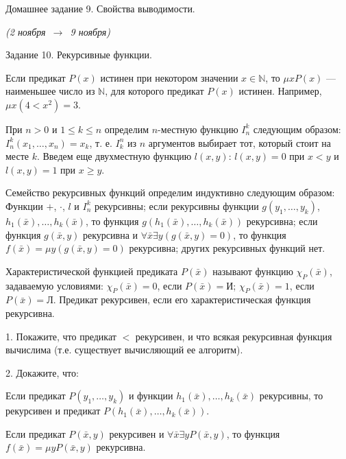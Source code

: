 \documentclass[a4paper,11pt]{article}
\begin{document}

   \newcommand{\enumsep}{\vspace{-2.8mm}
   		\begin{enumerate}[itemsep=0.4mm,leftmargin=2.5mm]}

\begin{center}
	{\Large Домашнее задание 9. Свойства выводимости.}

	{\it (2 ноября\ \(\to\)\ 9 ноября)}
\end{center}


\begin{center}
Задание 10. Рекурсивные функции. 
\end{center}

Если предикат $P(x)$ истинен при
некотором значении $x \in \mathbb{N}$, то $\mu x P(x)$ --- наименьшее
число из $\mathbb{N}$, для которого предикат $P(x)$ истинен. Например,
$\mu x(4 < x^2) = 3$.

 При $n > 0$ и $1 \leq k \leq n$ определим
$n$-местную функцию $I_n^k$ следующим образом: $I_n^k(x_1,\ldots, x_n)
= x_k$, т. е. $I_k^n$ из $n$ аргументов выбирает тот, который
стоит на месте $k$. Введем еще двухместную функцию $l(x, y)$:
$l(x, y) = 0$ при $x < y$ и $l(x, y) = 1$ при $x\geq y$.

 Семейство рекурсивных функций определим индуктивно следующим образом:
Функции $+$, $\cdot$, $l$ и $I_n^k$ рекурсивны; если рекурсивны
функции $g(y_1,\ldots, y_k)$, $h_1(\bar{x}),\ldots, h_k(\bar{x})$,
то функция $g(h_1(\bar{x}),\ldots, h_k(\bar{x}))$ рекурсивна; если
функция $g(\bar{x}, y)$ рекурсивна и $\forall\bar{x} \exists y
(g(\bar{x}, y) = 0)$, то функция $f(\bar{x}) = \mu y (g(\bar{x},
y) = 0)$ рекурсивна; других рекурсивных функций нет.

Характеристической функцией предиката $P(\bar{x})$ называют
функцию $\chi_{P}(\bar{x})$, задаваемую условиями:
$\chi_{P}(\bar{x}) = 0$, если $P(\bar{x}) =\text{И}$;
$\chi_{P}(\bar{x}) = 1$, если $P(\bar{x}) =\text{Л}$.
Предикат рекурсивен, если его характеристическая функция
рекурсивна.

1. Покажите, что предикат $<$ рекурсивен, и что всякая рекурсивная функция вычислима (т.е. существует вычисляющий ее алгоритм).
\medskip

2. Докажите, что: 

Если предикат $P(y_1,\ldots, y_k)$ и функции
$h_1(\bar{x}),\ldots, h_k(\bar{x})$ рекурсивны, то рекурсивен и
предикат $P(h_1(\bar{x}),\ldots, h_k(\bar{x}))$. 

Если
предикат $P(\bar{x}, y)$ рекурсивен и $\forall\bar{x} \exists y
P(\bar{x}, y)$, то функция $f(\bar{x}) = \mu y P(\bar{x}, y)$
рекурсивна. 
\medskip
\end{document}
